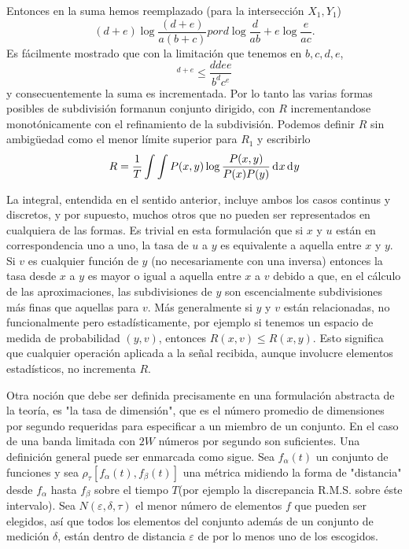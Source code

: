 \begin{appendices}
Entonces en la suma hemos reemplazado (para la intersecci\'on $X_{1}, Y_{1}$)
\begin{equation} (d + e) \log 
\frac{(d + e)}{a(b + c)}  por d \log \frac{d}{ab} 
+ e \log \frac{e}{ac}. \end{equation}
Es f\'acilmente mostrado que con la limitaci\'on que tenemos en $b, c,
d, e$,
\begin{equation} 
[\frac{d + e}{b + c}]^{d+e} \leq \frac{d{d} e{e}}{b^{d} c^{e}} \end{equation}
y consecuentemente la suma es incrementada. Por lo tanto las varias formas posibles
de subdivisi\'on formanun conjunto dirigido, con $R$ incrementandose monot\'onicamente
con el refinamiento de la subdivisi\'on. Podemos definir $R$ sin ambigüedad como el
menor l\'imite superior para $R_{1}$ y escribirlo
\begin{equation} R = \frac{1}{T} \int \int P(x,y) \log 
\frac{P(x,y)}{P(x) P(y)} \diff x  \diff y \end{equation}
			
La integral, entendida en el sentido anterior, incluye ambos los casos
continus y discretos, y por supuesto, muchos otros que no pueden ser
representados en cualquiera de las formas. Es trivial en esta
formulaci\'on que si $x$ y $u$ est\'an en correspondencia uno a uno,
la tasa de $u$ a $y$ es equivalente a aquella entre $x$ y $y$. Si $v$
es cualquier funci\'on de $y$ (no necesariamente con una inversa)
entonces la tasa desde $x$ a $y$ es mayor o igual a aquella entre $x$
a $v$ debido a que, en el c\'alculo de las aproximaciones, las
subdivisiones de $y$ son escencialmente subdivisiones m\'as finas que
aquellas para $v$. M\'as generalmente si $y$ y $v$ est\'an
relacionadas, no funcionalmente pero estad\'isticamente, por ejemplo
si tenemos un espacio de medida de probabilidad $(y, v)$, entonces
$R(x,v) \leq R(x,y)$. Esto significa que cualquier operaci\'on
aplicada a la señal recibida, aunque involucre elementos
estad\'isticos, no incrementa $R$.

Otra noci\'on que debe ser definida precisamente en una formulaci\'on
abstracta de la teor\'ia, es "la tasa de dimensi\'on", que es el
n\'umero promedio de dimensiones por segundo requeridas para
especificar a un miembro de un conjunto. En el caso de una banda
limitada con $2W$ n\'umeros por segundo son suficientes. Una
definici\'on general puede ser enmarcada como sigue. Sea
$f_{\alpha}(t)$ un conjunto de funciones y sea $\rho_{\tau} \left
[f_{\alpha}(t),f_{\beta}(t) \right ]$ una m\'etrica midiendo la forma
de "distancia" desde $f_{\alpha}$ hasta $f_{\beta}$ sobre el tiempo
$T$(por ejemplo la discrepancia R.M.S. sobre \'este intervalo). Sea
$N(\varepsilon, \delta, \tau)$ el menor n\'umero de elementos $f$
que pueden ser elegidos, as\'i que todos los elementos del conjunto
adem\'as de un conjunto de medici\'on $\delta$, est\'an dentro de
distancia $\varepsilon$ de por lo menos uno de los escogidos.


\end{appendices}
